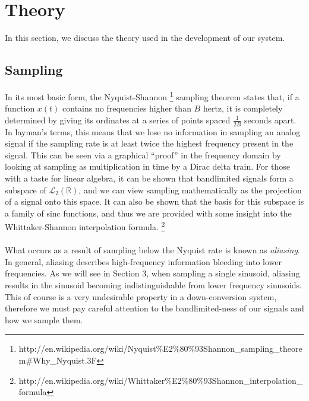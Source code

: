 \documentclass[11pt]{article}
\begin{document}
\section{Theory}
In this section, we discuss the theory used in the development of our system.

    \subsection{Sampling}
    In its most basic form, the Nyquist-Shannon \footnote{http://en.wikipedia.org/wiki/Nyquist\%E2\%80\%93Shannon\_sampling\_theorem\#Why\_Nyquist.3F} sampling theorem states that, if a function $x(t)$ contains no frequencies higher than $B$ hertz, it is completely determined by giving its ordinates at a series of points spaced $\frac{1}{2B}$ seconds apart. In layman's terms, this means that we lose no information in sampling an analog signal if the sampling rate is at least twice the highest frequency present in the signal. This can be seen via a graphical ``proof'' in the frequency domain by looking at sampling as multiplication in time by a Dirac delta train. For those with a taste for linear algebra, it can be shown that bandlimited signals form a subspace of $\mathscr{L}_2(\mathbb{R})$, and we can view sampling mathematically as the projection of a signal onto this space. It can also be shown that the basis for this subspace is a family of sinc functions, and thus we are provided with some insight into the Whittaker-Shannon interpolation formula. \footnote{http://en.wikipedia.org/wiki/Whittaker\%E2\%80\%93Shannon\_interpolation\_formula}
    \\
    \\
    \noindent What occurs as a result of sampling below the Nyquist rate is known as \emph{aliasing}. In general, aliasing describes high-frequency information bleeding into lower frequencies. As we will see in Section 3, when sampling a single sinusoid, aliasing results in the sinusoid becoming indistinguishable from lower frequency sinusoids. This of course is a very undesirable property in a down-conversion system, therefore we must pay careful attention to the bandlimited-ness of our signals and how we sample them.
\end{document}
